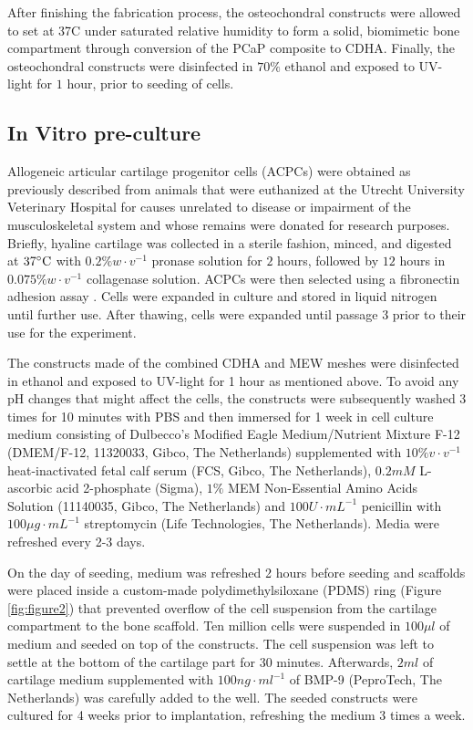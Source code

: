\documentclass[twocolumn, serif, empirical, authordate, seplic]{jote-article}
\begin{document}
After finishing the fabrication process, the osteochondral constructs were allowed to set at 37\degree C under saturated relative humidity to form a solid, biomimetic bone compartment through conversion of the PCaP composite to CDHA. Finally, the osteochondral constructs were disinfected in $70\%$ ethanol and exposed to UV-light for $1$ hour, prior to seeding of cells.

 {}\subsection*{In Vitro pre-culture} 

Allogeneic articular cartilage progenitor cells (ACPCs) were obtained as previously described \parencite{Levato2017, Williams2010} from animals that were euthanized at the Utrecht University Veterinary Hospital for causes unrelated to disease or impairment of the musculoskeletal system and whose remains were donated for research purposes. Briefly, hyaline cartilage was collected in a sterile fashion, minced, and digested at $37\degree \text{C}$ with $0.2\% w\cdot v^{-1}$ pronase solution for $2$ hours, followed by $12$ hours in $0.075\%
w\cdot v^{-1}$ collagenase solution. ACPCs were then selected using a fibronectin adhesion assay \parencite{Levato2017}. Cells were expanded in culture and stored in liquid nitrogen until further use. After thawing, cells were expanded until passage 3 prior to their use for the experiment.

The constructs made of the combined CDHA and MEW meshes were disinfected in ethanol and exposed to UV-light for 1 hour as mentioned above. To avoid any pH changes that might affect the cells, the constructs were subsequently washed 3 times for 10 minutes with PBS and then immersed for 1 week in cell culture medium consisting of Dulbecco's Modified Eagle Medium/Nutrient Mixture F-12 (DMEM/F-12, 11320033, Gibco, The Netherlands) supplemented with $10\% v\cdot v^{-1}$
heat-inactivated fetal calf serum (FCS, Gibco, The Netherlands), $0.2 mM$ L-ascorbic acid 2-phosphate (Sigma), $1\%$ MEM Non-Essential Amino Acids Solution (11140035, Gibco, The Netherlands) and $100 U\cdot mL^{-1}$ penicillin with $100 \mu g\cdot mL^{-1}$
streptomycin (Life Technologies, The Netherlands). Media were refreshed every 2-3 days.

On the day of seeding, medium was refreshed 2 hours before seeding and scaffolds were placed inside a custom-made polydimethylsiloxane (PDMS) ring (Figure \ref{fig:figure2}) that prevented overflow of the cell suspension from the cartilage compartment to the bone scaffold. Ten million cells were suspended in $100 \mu l$ of medium and seeded on top of the constructs. The cell suspension was left to settle at the bottom of the cartilage part for 30 minutes. Afterwards, $2 ml$ of cartilage medium supplemented with $ 100 ng\cdot ml^{-1} $ of BMP-9 (PeproTech, The Netherlands) was carefully added to the well. The seeded constructs were cultured for 4 weeks prior to implantation, refreshing the medium 3 times a week.
\end{document}
